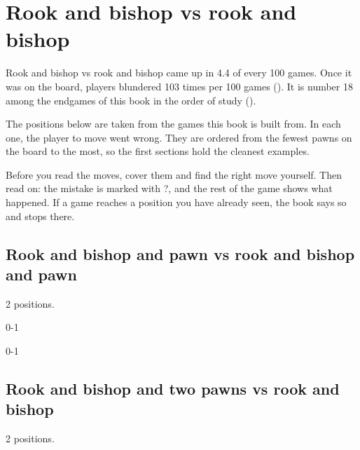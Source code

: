 \chapter{Rook and bishop vs rook and bishop}\label{ch:rook-and-bishop-vs-rook-and-bishop}
Rook and bishop vs rook and bishop came up in 4.4 of every 100 games. Once it was on the board, players blundered 103 times per 100 games (). It is number 18 among the endgames of this book in the order of study ().

The positions below are taken from the games this book is built from. In each one, the player to move went wrong. They are ordered from the fewest pawns on the board to the most, so the first sections hold the cleanest examples.

Before you read the moves, cover them and find the right move yourself. Then read on: the mistake is marked with ?, and the rest of the game shows what happened. If a game reaches a position you have already seen, the book says so and stops there.


\section{Rook and bishop and pawn vs rook and bishop and pawn}
2 positions.


0-1\par
{}

0-1\par
\section{Rook and bishop and two pawns vs rook and bishop}
2 positions.

